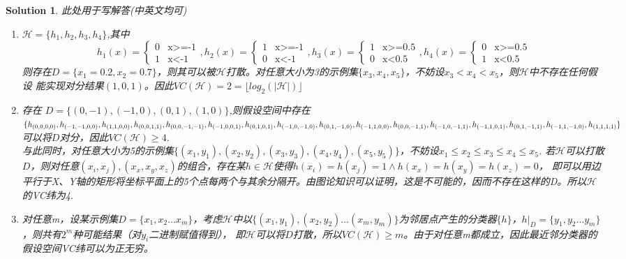 \documentclass[a4paper,UTF8]{article}
\newtheorem*{solution}{Solution}
\numberwithin{equation}{section}
\begin{document}
\begin{solution}
此处用于写解答(中英文均可)
\begin{enumerate}[(1)]
    \item $\mathcal H = \{h_1,h_2,h_3,h_4\}$,其中
        $$h_1(x)=\begin{cases}
            0& \text{x>=-1}\\
            1& \text{x<-1}
        \end{cases},
        h_2(x)=\begin{cases}
            1& \text{x>=-1}\\
            0& \text{x<-1}
        \end{cases},
        h_3(x)=\begin{cases}
            1& \text{x>=0.5}\\
            0& \text{x<0.5}
        \end{cases},
        h_4(x)=\begin{cases}
            0& \text{x>=0.5}\\
            1& \text{x<0.5}
        \end{cases}$$
        则存在$D=\{x_1=0.2,x_2=0.7\}$，则其可以被$\mathcal H$打散。对任意大小为3的示例集$\{x_3,x_4,x_5\}$，不妨设$x_3<x_4<x_5$，则$\mathcal H$中不存在任何假设
        能实现对分结果$(1,0,1)$。因此$VC(\mathcal H) = 2 =\lfloor log_2(|\mathcal H|) \rfloor$
    \item 存在 $D = \{(0,-1),(-1,0),(0,1),(1,0)\}$,则假设空间中存在$\{h_{(0,0,0,0)},h_{(-1,-1,0,0)},h_{(1,1,0,0)},\\
        h_{(0,0,1,1)},h_{(0,0,-1,-1)},h_{(-1,0,0,1)},h_{(0,1,0,1)},h_{(-1,0,-1,0)},h_{(0,1,-1,0)},h_{(-1,1,0,0)},h_{(0,0,-1,1)},\\
        h_{(-1,0,-1,1)},h_{(-1,1,0,1)},h_{(0,1,-1,1)},h_{(-1,1,-1,0)},h_{(1,1,1,1)}\}$ 可以将$D$对分，因此$VC(\mathcal H) \ge 4.$\\
        与此同时，对任意大小为5的示例集$\{(x_1,y_1),(x_2,y_2),(x_3,y_3),(x_4,y_4),(x_5,y_5)\}$，不妨设$x_1 \le x_2 \le x_3 \le x_4 \le x_5$.
        若$\mathcal H$可以打散$D$，则对任意$(x_i,x_j),(x_x,x_y,x_z)$的组合，存在某$h\in \mathcal H$使得$h(x_i)=h(x_j)=1 \wedge h(x_x)=h(x_y)=h(x_z)=0$，
        即可以用边平行于X、Y轴的矩形将坐标平面上的5个点每两个与其余分隔开。由图论知识可以证明，这是不可能的，因而不存在这样的D。所以$\mathcal H$的VC纬为4.
    \item 对任意m，设某示例集$D=\{x_1,x_2 \dots x_m\}$，考虑$\mathcal H$中以$\{(x_1,y_1),(x_2,y_2) \dots (x_m,y_m)\}$为邻居点产生的分类器$\{h\}$，$h|_D=\{y_1,y_2\dots y_m\}$，则共有$2^m$种可能结果（对$y_i$二进制赋值得到），
        即$\mathcal H$可以将$D$打散，所以$VC(\mathcal H) \ge m$。由于对任意m都成立，因此最近邻分类器的假设空间VC纬可以为正无穷。
\end{enumerate}
\end{solution}
\end{document}

